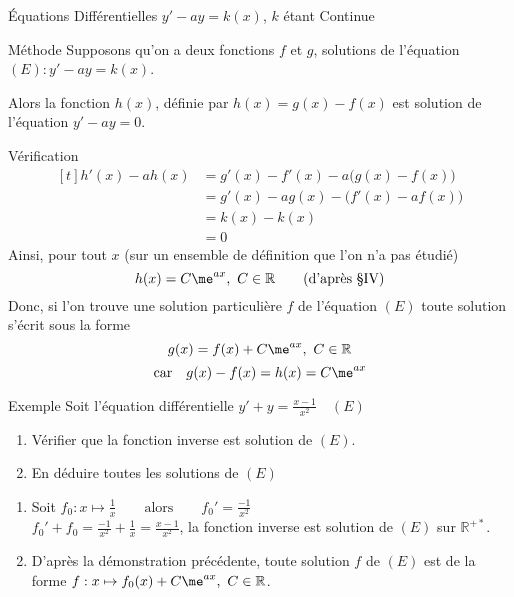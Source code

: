 \documentclass{cours}
\begin{document}
    \begin{Gpartie}{Équations Différentielles $y'-ay=k(x)$, $k$ étant Continue} 
        \begin{Spartie}{Méthode} 
            Supposons qu'on a deux fonctions $f$ et $g$, solutions de l'équation $(E): y'-ay=k(x)$.

            Alors la fonction $h(x)$, définie par $h(x)=g(x)-f(x)$ est solution de l'équation $y'-ay=0$.
            \begin{SSpartie}{Vérification} 
                \[\begin{aligned}[t]
                    h'(x)-ah(x)&=g'(x)-f'(x)-a\big(g(x)-f(x)\big) \\
                    &=g'(x)-ag(x)-\big(f'(x)-af(x)\big) \\
                    &=k(x)-k(x) \\
                    &=0
                \end{aligned}\]
                Ainsi, pour tout $x$ (sur un ensemble de définition que l'on n’a pas étudié)
                \[h(x)=C\me^{ax},\ C\in\mathbb{R}\qquad\text{(d'après \textsection IV)}\]
                Donc, si l'on trouve une solution particulière $f$ de l'équation $(E)$ toute solution s'écrit sous la forme
                \[g(x)=f(x)+C\me^{ax},\ C\in\mathbb{R}\]
                \[\text{car}\quad g(x)-f(x)=h(x)=C\me^{ax}\] 
            \end{SSpartie}
        \end{Spartie}
        \begin{Spartie}{Exemple} 
            Soit l'équation différentielle $y'+y=\frac{x-1}{x^2}\quad(E)$
            \begin{enumerate}
                \item Vérifier que la fonction inverse est solution de $(E)$.
                \item En déduire toutes les solutions de $(E)$
            \end{enumerate}
            \begin{enumerate}
                \item Soit $f_0:x\mapsto\frac{1}{x}\qquad\text{alors}\qquad f_0'=\frac{-1}{x^2}$ \\
                $f_0'+f_0=\frac{-1}{x^2}+\frac{1}{x}=\frac{x-1}{x^2}$, la fonction inverse est solution de $(E)$ sur $\mathbb{R^{+*}}$.
                \item D'après la démonstration précédente, toute solution $f$ de $(E)$ est de la forme $f:x\mapsto f_0(x)+C\me^{ax},\ C\in\mathbb{R}$. \\

\end{enumerate}
\end{Spartie}
\end{Gpartie}
\end{document}
